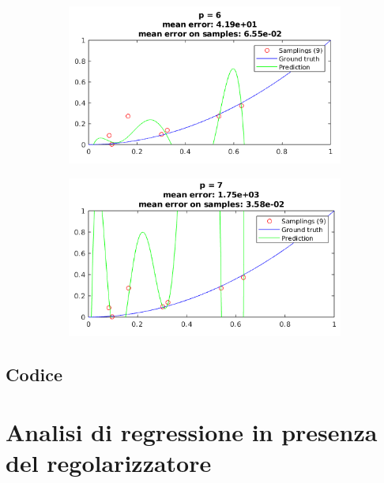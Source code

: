 \documentclass[12pt]{article}
\begin{document}
\begin{figure}[H]
  \centering
  \begin{subfigure}{0.45\textwidth}
    \includegraphics[width=\textwidth]{plots/regression/p_eq_6.png}
  \end{subfigure}
  \begin{subfigure}{0.45\textwidth}
    \includegraphics[width=\textwidth]{plots/regression/p_eq_7.png}
  \end{subfigure}
\end{figure}

\newpage
\subsection{Codice}


\section{Analisi di regressione in presenza del regolarizzatore}
\end{document}

